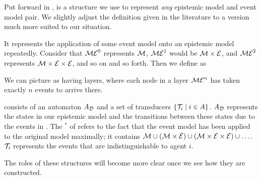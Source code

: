 \documentclass[12pt, a4paper]{article}
\begin{document}
Put forward in \cite{AutomataTechniques}, \mestar is a structure we use to
represent \textit{any} epistemic model and event model pair. We slightly adjust
the definition given in the literature to a version much more suited to our
situation. 

It represents the application of some event model  onto an epistemic
model  repeatedly. Consider that $\mathcal{ME}^0$ represents $\mathcal{M}$,
$\mathcal{ME}^1$ would be $\mathcal{M} \times \mathcal{E}$, and $\mathcal{ME}^2$ represents $\mathcal{M}
\times \mathcal{E} \times \mathcal{E}$, and so on and so forth. Then we define \mestar as


We can picture \mestar as having layers, where each node in a layer $\mathcal{ME}^n$ has taken
exactly $n$ events to arrive there.

\begin{center}
\end{center}

\mestar consists of an automaton $A_{\mathcal{D}}$ and a set of transducers $\left\{
\mathcal{T}_i \mid i \in A \right\}$. $A_{\mathcal{D}}$ represents the states in our
epistemic model  and the transitions between these states due to the
events in . The $^\ast$ of \mestar refers to the fact that the event
model has been applied to the original model maximally; it contains $\mathcal{M}
\cup \left( \mathcal{M} \times \mathcal{E}  \right) \cup \left( \mathcal{M} \times \mathcal{E}
  \times \mathcal{E} \right) \cup \ldots$. $\mathcal{T}_i$ represents the events that are
indistinguishable to agent $i$.

\bigskip \bigskip \bigskip

The roles of these structures will become more clear once we see how they are
constructed. 
\end{document}
